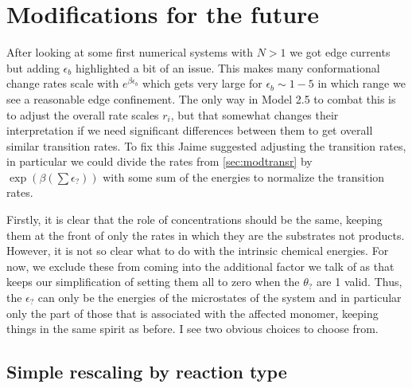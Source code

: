 \documentclass[11pt]{article}
\begin{document}
\newpage
\section{Modifications for the future}
After looking at some first numerical systems with $N>1$ we got edge currents but adding $\epsilon_b$ highlighted a bit of an issue.
This makes many conformational change rates scale with $e^{\beta\epsilon_b}$ which gets very large for $\epsilon_b \sim 1-5$ in which range we see a reasonable edge confinement.
The only way in Model 2.5 to combat this is to adjust the overall rate scales $r_i$, but that somewhat changes their interpretation if we need significant differences between them to get overall similar transition rates.
To fix this Jaime suggested adjusting the transition rates, in particular we could divide the rates from \cref{sec:modtransr} by $\exp(\beta(\sum \epsilon_?))$ with some sum of the energies to normalize the transition rates.

Firstly, it is clear that the role of concentrations should be the same, keeping them at the front of only the rates in which they are the substrates not products.
However, it is not so clear what to do with the intrinsic chemical energies.
For now, we exclude these from coming into the additional factor we talk of as that keeps our simplification of setting them all to zero when the $\theta_?$ are 1 valid.
Thus, the $\epsilon_?$ can only be the energies of the microstates of the system and in particular only the part of those that is associated with the affected monomer, keeping things in the same spirit as before.
I see two obvious choices to choose from.

\subsection{Simple rescaling by reaction type}

\newpage
\end{document}
